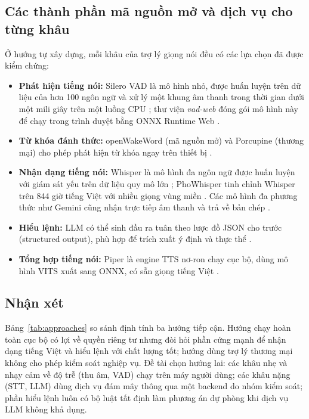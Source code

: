 \subsection{Các thành phần mã nguồn mở và dịch vụ cho từng khâu}
Ở hướng tự xây dựng, mỗi khâu của trợ lý giọng nói đều có các lựa chọn đã được kiểm chứng:
\begin{itemize}
  \item \textbf{Phát hiện tiếng nói:} Silero VAD là mô hình nhỏ, được huấn luyện trên dữ liệu của hơn 100 ngôn ngữ và xử lý một khung âm thanh trong thời gian dưới một mili giây trên một luồng CPU \cite{silero}; thư viện \textit{vad-web} đóng gói mô hình này để chạy trong trình duyệt bằng ONNX Runtime Web \cite{vadweb,onnxweb}.
  \item \textbf{Từ khóa đánh thức:} openWakeWord (mã nguồn mở) và Porcupine (thương mại) cho phép phát hiện từ khóa ngay trên thiết bị \cite{openwakeword,porcupine}.
  \item \textbf{Nhận dạng tiếng nói:} Whisper là mô hình đa ngôn ngữ được huấn luyện với giám sát yếu trên dữ liệu quy mô lớn \cite{radford2022whisper}; PhoWhisper tinh chỉnh Whisper trên 844 giờ tiếng Việt với nhiều giọng vùng miền \cite{phowhisper}. Các mô hình đa phương thức như Gemini cũng nhận trực tiếp âm thanh và trả về bản chép \cite{geminiaudio}.
  \item \textbf{Hiểu lệnh:} LLM có thể sinh đầu ra tuân theo lược đồ JSON cho trước (structured output), phù hợp để trích xuất ý định và thực thể \cite{geministructured}.
  \item \textbf{Tổng hợp tiếng nói:} Piper là engine TTS nơ-ron chạy cục bộ, dùng mô hình VITS xuất sang ONNX, có sẵn giọng tiếng Việt \cite{piper,vits}.
\end{itemize}

\subsection{Nhận xét}
Bảng~\ref{tab:approaches} so sánh định tính ba hướng tiếp cận. Hướng chạy hoàn toàn cục bộ có lợi về quyền riêng tư nhưng đòi hỏi phần cứng mạnh để nhận dạng tiếng Việt và hiểu lệnh với chất lượng tốt; hướng dùng trợ lý thương mại không cho phép kiểm soát nghiệp vụ. Đề tài chọn hướng lai: các khâu nhẹ và nhạy cảm về độ trễ (thu âm, VAD) chạy trên máy người dùng; các khâu nặng (STT, LLM) dùng dịch vụ đám mây thông qua một backend do nhóm kiểm soát; phần hiểu lệnh luôn có bộ luật tất định làm phương án dự phòng khi dịch vụ LLM không khả dụng.

